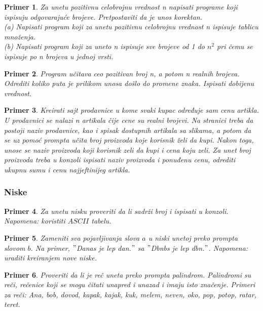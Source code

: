\documentclass[a4paper]{article}
\newtheorem{primer}{Primer}[section]
\begin{document}
\begin{primer}
Za unetu pozitivnu celobrojnu vrednost n napisati programe
koji ispisuju odgovarajuće brojeve. Pretpostaviti da je unos korektan.\\
(a) Napisati program koji za unetu pozitivnu celobrojnu vrednost n ispisuje
tablicu množenja.\\
(b) Napisati program koji za uneto n ispisuje sve brojeve od 1 do $n^2$ pri čemu se ispisuje po n brojeva u jednoj vrsti.\\
\end{primer}

\begin{primer}
Program učitava ceo pozitivan broj n, a potom n realnih
brojeva. Odrediti koliko puta je prilikom unosa došlo do promene znaka. Ispisati
dobijenu vrednost.
\end{primer}

\begin{primer}
Kreirati sajt prodavnice u kome svaki kupac određuje sam cenu artikla. U prodavnici se nalazi n artikala čije cene su realni brojevi. Na stranici treba da postoji naziv prodavnice, kao i spisak dostupnih artikala sa slikama, a potom da se uz pomoć prompta učita broj proizvoda koje korisnik želi da kupi. Nakon toga, unose se naziv proizvoda koji korisnik zeli da kupi i cena koju zeli. Za unet broj proizvoda treba u konzoli ispisati naziv proizvoda i ponuđenu cenu, odrediti ukupnu sumu i cenu najjeftinijeg artikla.
\end{primer}

\subsubsection{Niske}
\begin{primer}
Za unetu nisku proveriti da li sadrži broj i ispisati u konzoli. Napomena: koristiti $ASCII$ tabelu.
\end{primer}

\begin{primer}
Zameniti sva pojavljivanja slova $a$ u niski unetoj preko prompta slovom $b$. Na primer, $"$Danas je lep dan.$"$ sa $"$Dbnbs je lep dbn.$"$. Napomena: uraditi kreiranjem nove niske.
\end{primer}

\begin{primer}
Proveriti da li je reč uneta preko prompta palindrom. Palindromi su reči, rečenice koji se mogu čitati unapred i unazad i imaju isto značenje. Primeri za reči: Ana, bob, dovod, kapak, kajak, kuk, melem, neven, oko, pop, potop, ratar, teret. 
\end{primer}
\end{document}
